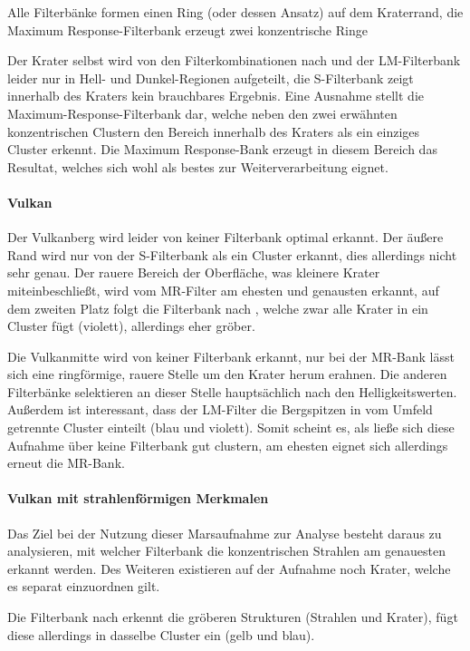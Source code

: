 Alle Filterbänke formen einen Ring (oder dessen Ansatz) auf dem Kraterrand, die Maximum Response-Filterbank erzeugt zwei konzentrische Ringe

Der Krater selbst wird von den Filterkombinationen nach \cite{jain_91} und der LM-Filterbank leider nur in Hell- und Dunkel-Regionen aufgeteilt, die S-Filterbank zeigt innerhalb des Kraters kein brauchbares Ergebnis. Eine Ausnahme stellt die Maximum-Response-Filterbank dar, welche neben den zwei erwähnten konzentrischen Clustern den Bereich innerhalb des Kraters als ein einziges Cluster erkennt. Die Maximum Response-Bank erzeugt in diesem Bereich das Resultat, welches sich wohl als bestes zur Weiterverarbeitung eignet.

\paragraph{Vulkan}
Der Vulkanberg wird leider von keiner Filterbank optimal erkannt. Der äußere Rand wird nur von der S-Filterbank als ein Cluster erkannt, dies allerdings nicht sehr genau. Der rauere Bereich der Oberfläche, was kleinere Krater miteinbeschließt, wird vom MR-Filter am ehesten und genausten erkannt, auf dem zweiten Platz folgt die Filterbank nach \cite{jain_91}, welche zwar alle Krater in ein Cluster fügt (violett), allerdings eher gröber.

Die Vulkanmitte wird von keiner Filterbank erkannt, nur bei der MR-Bank lässt sich eine ringförmige, rauere Stelle um den Krater herum erahnen. Die anderen Filterbänke selektieren an dieser Stelle hauptsächlich nach den Helligkeitswerten. Außerdem ist interessant, dass der LM-Filter die Bergspitzen in vom Umfeld getrennte Cluster einteilt (blau und violett). Somit scheint es, als ließe sich diese Aufnahme über keine Filterbank gut clustern, am ehesten eignet sich allerdings erneut die MR-Bank.

\paragraph{Vulkan mit strahlenförmigen Merkmalen}

Das Ziel bei der Nutzung dieser Marsaufnahme zur Analyse besteht daraus zu analysieren, mit welcher Filterbank die konzentrischen Strahlen am genauesten erkannt werden. Des Weiteren existieren auf der Aufnahme noch Krater, welche es separat einzuordnen gilt.

Die Filterbank nach \cite{jain_91} erkennt die gröberen Strukturen (Strahlen und Krater), fügt diese allerdings in dasselbe Cluster ein (gelb und blau).

